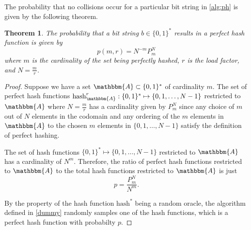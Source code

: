 \documentclass[hidelinks,11pt,final]{article}
\newcommand{\envnumstyle}{section}
\theoremstyle{plain}
\newtheorem{theorem}{Theorem}[\envnumstyle]
\begin{document}
The probability that no collisions occur for a particular bit string in \cref{alg:ph} is given by the following theorem.
\begin{theorem}
The probability that a bit string $b \in \{0,1\}^{*}$ results in a perfect hash function is given by
\begin{equation}
\label{eq:p_m_N}
	p(m,r) = N^{-m} P^{N}_{m}
\end{equation}
where $m$ is the cardinality of the set being perfectly hashed, $r$ is the load factor, and $N = \frac{m}{r}$.
\end{theorem}
\begin{proof}
Suppose we have a set $\mathbbm{A} \subset \{0,1\}^*$ of cardinality $m$.
The set of perfect hash functions $\mathrm{hash}_{\mathbbm{A}}^{r} : \{0,1\}^* \mapsto \{0,1,\ldots,N-1\}$ restricted to $\mathbbm{A}$ where $N = \frac{m}{r}$ has a cardinality given by $P^{N}_{m}$ since any choice of $m$ out of $N$ elements in the codomain and any ordering of the $m$ elements in $\mathbbm{A}$ to the chosen $m$ elements in $\{0,1,\ldots,N-1\}$ satisfy the definition of perfect hashing.


The set of hash functions $\{0,1\}^* \mapsto \{0,1,\ldots,N-1\}$ restricted to $\mathbbm{A}$ has a cardinality of $N^m$.
Therefore, the ratio of perfect hash functions restricted to $\mathbbm{A}$ to the total hash functions restricted to $\mathbbm{A}$ is just
\begin{equation}
	p = \frac{P^{N}_{m}}{N^m}.
\end{equation}

By the property of the hash function $\mathrm{hash}^*$ being a random oracle, the algorithm defined in \cref{dummy} randomly samples one of the hash functions, which is a perfect hash function with probabilty $p$.

	

\end{proof}
\end{document}
